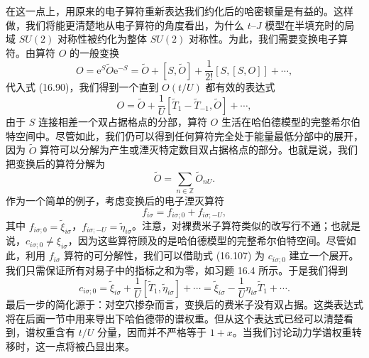 在这一点上，用原来的电子算符重新表达我们约化后的哈密顿量是有益的。这样做，我们将能更清楚地从电子算符的角度看出，为什么 $t$--$J$ 模型在半填充时的局域 $SU(2)$ 对称性被约化为整体 $SU(2)$ 对称性。为此，我们需要变换电子算符。由算符 $O$ 的一般变换
\begin{equation*}
O=\mathrm{e}^{S}\tilde{O}\mathrm{e}^{-S}=\tilde{O}+[S,\tilde{O}]+\frac{1}{2!}[S,[S,O]]+\cdots,\tag{16.106}
\end{equation*}
代入式 (16.90)，我们得到一个直到 $O(t/U)$ 都有效的表达式
\begin{equation*}
O=\tilde{O}+\frac{1}{U}[\tilde{T}_{1}-\tilde{T}_{-1},\tilde{O}]+\cdots,\tag{16.107}
\end{equation*}
由于 $S$ 连接相差一个双占据格点的分部，算符 $O$ 生活在哈伯德模型的完整希尔伯特空间中。尽管如此，我们仍可以得到任何算符完全处于能量最低分部中的展开，因为 $\tilde{O}$ 算符可以分解为产生或湮灭特定数目双占据格点的部分。也就是说，我们把变换后的算符分解为
\begin{equation*}
\tilde{O}=\sum_{n\in\mathbb{Z}}\tilde{O}_{nU}.\tag{16.108}
\end{equation*}
作为一个简单的例子，考虑变换后的电子湮灭算符
\begin{equation*}
f_{i\sigma}=f_{i\sigma;0}+f_{i\sigma;-U},\tag{16.109}
\end{equation*}
其中 $f_{i\sigma;0}=\tilde{\xi}_{i\sigma}$，$f_{i\sigma;-U}=\tilde{\eta}_{i\sigma}$。注意，对裸费米子算符类似的改写行不通；也就是说，$c_{i\sigma;0}\neq\xi_{i\sigma}$，因为这些算符顾及的是哈伯德模型的完整希尔伯特空间。尽管如此，利用 $f_{i\sigma}$ 算符的可分解性，我们可以借助式 (16.107) 为 $c_{i\sigma;0}$ 建立一个展开。我们只需保证所有对易子中的指标之和为零，如习题 16.4 所示。于是我们得到
\begin{equation*}
c_{i\sigma;0}=\tilde{\xi}_{i\sigma}+\frac{1}{U}[\tilde{T}_{1},\tilde{\eta}_{i\sigma}]+\cdots=\tilde{\xi}_{i\sigma}-\frac{1}{U}\eta_{i\sigma}\tilde{T}_{1}+\cdots.\tag{16.110}
\end{equation*}
最后一步的简化源于：对空穴掺杂而言，变换后的费米子没有双占据。这类表达式将在后面一节中用来导出下哈伯德带的谱权重。但从这个表达式已经可以清楚看到，谱权重含有 $t/U$ 分量，因而并不严格等于 $1+x$。当我们讨论动力学谱权重转移时，这一点将被凸显出来。

